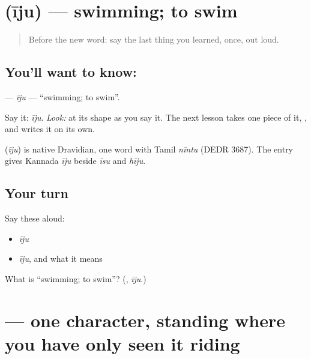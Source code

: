 \section[\texorpdfstring{\kn{ಈಜು} (īju)}{ಈಜು (īju)}]{ (īju) — swimming; to swim}

\label{lesson:KA-C26-iiju}



\begin{quote}
Before the new word: say the last thing you learned, once, out loud.
\end{quote}

\subsection*{You'll want to know: }
\textbf{} — \emph{īju} — \textquotedblleft{}swimming; to swim\textquotedblright{}.

Say it: \emph{īju}. \emph{Look:} at its shape as you say it. The next lesson takes one piece of it, \textbf{}, and writes it on its own.

\begin{cousinweb}
\textbf{} (\emph{īju}) is native Dravidian, one word with Tamil \emph{nīntu} (DEDR 3687). The entry gives Kannada \emph{īju} beside \emph{īsu} and \emph{hīju}.
\end{cousinweb}

\subsection*{Your turn}
Say these aloud:

\begin{itemize}
\raggedright
  \item \emph{īju}
  \item \emph{īju}, and what it means
\end{itemize}

\begin{tcolorbox}[breakable,colback=teal!4,colframe=teal!35!black,title={Before you move on}]
What is \textquotedblleft{}swimming; to swim\textquotedblright{}? (\textbf{}, \emph{īju}.)
\end{tcolorbox}
\section[\texorpdfstring{\kn{ಈ} (ī)}{ಈ (ī)}]{ — one character, standing where you have only seen it riding}

